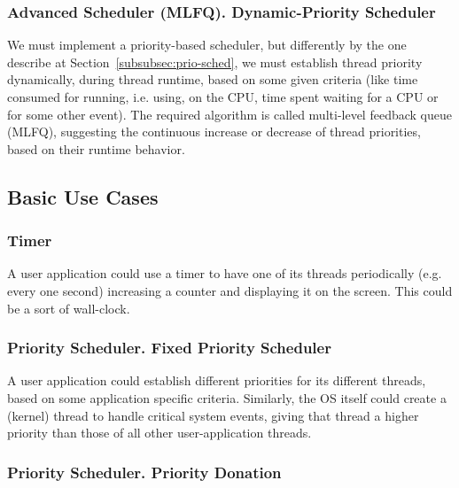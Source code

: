 \subsubsection{Advanced Scheduler (MLFQ). Dynamic-Priority Scheduler}

We must implement a priority-based scheduler, but differently by the one describe at Section~\ref{subsubsec:prio-sched}, we must establish thread priority dynamically, during thread runtime, based on some given criteria (like time consumed for running, i.e. using, on the CPU, time spent waiting for a CPU or for some other event). The required algorithm is called multi-level feedback queue (MLFQ), suggesting the continuous increase or decrease of thread priorities, based on their runtime behavior.


\subsection{Basic Use Cases}

\subsubsection{Timer}

A user application could use a timer to have one of its threads periodically (e.g. every one second) increasing a counter and displaying it on the screen. This could be a sort of wall-clock. 


\subsubsection{Priority Scheduler. Fixed Priority Scheduler}

A user application could establish different priorities for its different threads, based on some application specific criteria. Similarly, the OS itself could create a (kernel) thread to handle critical system events, giving that thread a higher priority than those of all other user-application threads. 


\subsubsection{Priority Scheduler. Priority Donation}

